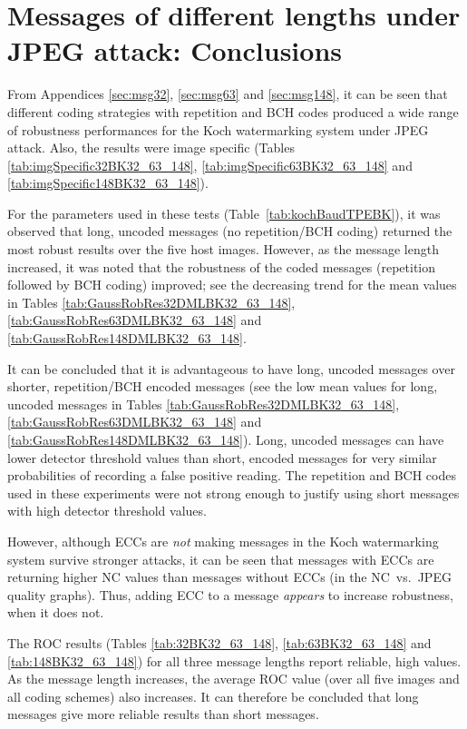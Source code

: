 \documentclass[12pt]{report}
\begin{document}
\section{Messages of different lengths under JPEG attack: Conclusions}
\label{sec:concVarbits}
From Appendices \ref{sec:msg32}, \ref{sec:msg63} and \ref{sec:msg148},
it can be seen that different coding strategies with 
repetition and BCH codes produced a wide range of 
robustness performances for the Koch watermarking system under JPEG attack. 
Also, the results were image specific (Tables \ref{tab:imgSpecific32BK32_63_148}, \ref{tab:imgSpecific63BK32_63_148}
and \ref{tab:imgSpecific148BK32_63_148}).

For the parameters used in these tests (Table~\ref{tab:kochBaudTPEBK}), it was observed that long, uncoded messages 
(no repetition/BCH coding) returned the most robust results over the five host images.
However, as the message length increased, it was noted that the robustness of the coded messages (repetition followed by BCH coding)
improved; see the decreasing trend for the mean values in Tables \ref{tab:GaussRobRes32DMLBK32_63_148}, \ref{tab:GaussRobRes63DMLBK32_63_148} 
and \ref{tab:GaussRobRes148DMLBK32_63_148}.

It can be concluded that it is advantageous to have long, uncoded messages over shorter, repetition/BCH encoded messages
(see the low mean values for long, uncoded messages in Tables \ref{tab:GaussRobRes32DMLBK32_63_148}, \ref{tab:GaussRobRes63DMLBK32_63_148}
and \ref{tab:GaussRobRes148DMLBK32_63_148}). Long, uncoded messages can have lower detector threshold values than short, encoded
messages for very similar probabilities of recording a false positive reading.
The repetition and BCH codes used in these experiments were
not strong enough to justify using short messages with high detector threshold values.

However, although ECCs are \emph{not} making messages in the Koch watermarking system survive stronger attacks,
it can be seen that messages with ECCs are returning higher NC values than messages without ECCs (in the NC~vs.~JPEG quality graphs).
Thus, adding ECC to a message \emph{appears} to increase robustness, when it does not.

The ROC results (Tables \ref{tab:32BK32_63_148}, \ref{tab:63BK32_63_148} and \ref{tab:148BK32_63_148})
for all three message lengths report reliable, high values. As the message length increases, the average ROC
value (over all five images and all coding schemes) also increases. It can therefore be concluded that long messages give more reliable
results than short messages.
\end{document}
